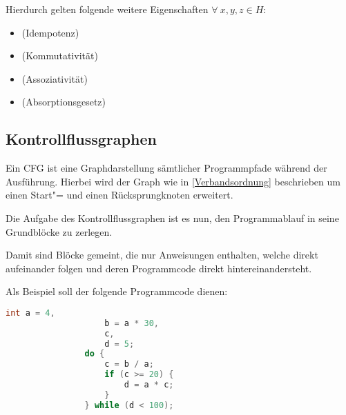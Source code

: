             Hierdurch gelten folgende weitere Eigenschaften
            \( \forall\ x, y, z \in H \):\cite{Ringel2005}

            \begin{itemize}
                \item {} (Idempotenz)
                \item {} (Kommutativität)
                \item {} (Assoziativität)
                \item {} (Absorptionsgesetz)
            \end{itemize}

        \subsection{Kontrollflussgraphen}\label{Kontrollflussgraphen}
            Ein
            \gls{CFG} ist eine Graphdarstellung sämtlicher Programmpfade während der Ausführung.
            Hierbei wird der Graph
            wie in
            \vref{Verbandsordnung} beschrieben um einen Start"= und
            einen Rücksprungknoten erweitert.

            Die Aufgabe des Kontrollflussgraphen ist es nun,
            den Programmablauf in seine Grundblöcke zu zerlegen.

            Damit sind Blöcke gemeint,
            die nur Anweisungen enthalten,
            welche direkt aufeinander folgen und
            deren Programmcode direkt hintereinandersteht.\cite[5]{Kulkarni2011}

            Als Beispiel soll der folgende Programmcode dienen:

            \begin{lstlisting}[caption={Beispiel C-Programm}, label={lst:Beispiel_C_Programm}, gobble=16, language=c]
                int a = 4,
                    b = a * 30,
                    c,
                    d = 5;
                do {
                    c = b / a;
                    if (c >= 20) {
                        d = a * c;
                    }
                } while (d < 100);
            \end{lstlisting}

